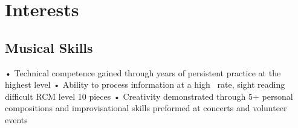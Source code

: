 \documentclass[letterpaper]{deedy-resume} %
\begin{document}
\begin{minipage}[t]{0.33\textwidth}
\section{Interests }
\subsection{Musical Skills}
•	Technical competence gained through 
years of persistent practice at the highest level
\newline
•	 Ability to process information at a high \newline \space \ rate, sight reading difficult RCM level 10 pieces 
\newline
•	 Creativity demonstrated through 5+ personal compositions and improvisational skills preformed at concerts and volunteer events 










\end{minipage} %
\hfill
%
%
\end{document}
